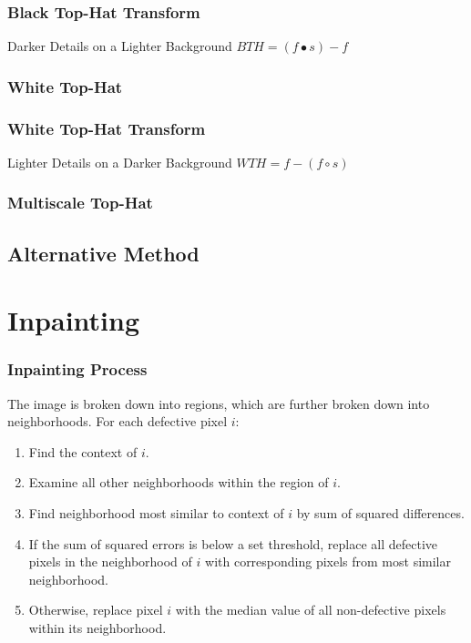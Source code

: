 \documentclass{beamer}
\begin{document}
\begin{frame}
\frametitle{Black Top-Hat Transform}
Darker Details on a Lighter Background
\linebreak
\linebreak
$BTH = (f \bullet s) - f$
\end{frame}

\subsubsection[White Top-Hat]{White Top-Hat}

\begin{frame}
\frametitle{White Top-Hat Transform}
Lighter Details on a Darker Background
\linebreak
\linebreak
$WTH = f - (f \circ s)$
\end{frame}

\subsubsection[Multiscale Top-Hat]{Multiscale Top-Hat}

\subsection[Alternative Method]{Alternative Method}

\section[Inpainting]{Inpainting}

\begin{frame}
\frametitle{Inpainting Process}
The image is broken down into regions, which are further broken down into neighborhoods. For each defective pixel $i$:
\begin{enumerate}
\item Find the context of $i$.
\item Examine all other neighborhoods within the region of $i$.
\item Find neighborhood most similar to context of $i$ by sum of squared differences.
\item If the sum of squared errors is below a set threshold, replace all defective pixels in the neighborhood of $i$ with corresponding pixels from most similar neighborhood.
\item Otherwise, replace pixel $i$ with the median value of all non-defective pixels within its neighborhood.
\end{enumerate}
\end{frame}
\end{document}
